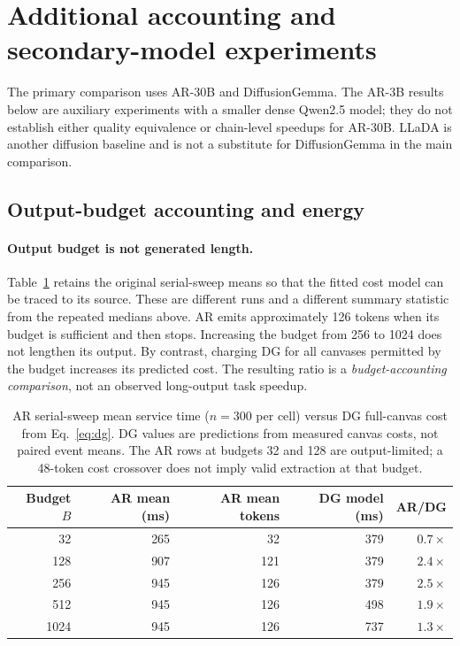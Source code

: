 \section{Additional accounting and secondary-model experiments}
\label{app:secondary}

The primary comparison uses AR-30B and DiffusionGemma.
The AR-3B results below are auxiliary experiments with a smaller dense
Qwen2.5 model; they do not establish either quality equivalence or
chain-level speedups for AR-30B. LLaDA is another diffusion baseline and
is not a substitute for DiffusionGemma in the main comparison.

\subsection{Output-budget accounting and energy}
\paragraph{Output budget is not generated length.}
Table~\ref{tab:niche} retains the original serial-sweep means so that
the fitted cost model can be traced to its source. These are different
runs and a different summary statistic from the repeated medians above.
AR emits approximately 126 tokens when its budget is sufficient and
then stops. Increasing the budget from 256 to 1024 does not lengthen
its output. By contrast, charging DG for all canvases permitted by the
budget increases its predicted cost. The resulting ratio is a
\emph{budget-accounting comparison}, not an observed long-output task
speedup.

\begin{table}[ht]
\centering
\caption{AR serial-sweep mean service time ($n{=}300$ per cell) versus
DG full-canvas cost from Eq.~\ref{eq:dg}. DG values are predictions
from measured canvas costs, not paired event means. The AR rows at
budgets 32 and 128 are output-limited; a 48-token cost crossover does
not imply valid extraction at that budget.}
\label{tab:niche}
\begin{tabular}{@{}rrrrr@{}}
\toprule
Budget $B$ & AR mean (ms) & AR mean tokens & DG model (ms) & AR/DG \\
\midrule
32 & 265 & 32 & 379 & $0.7\times$ \\
128 & 907 & 121 & 379 & $2.4\times$ \\
256 & 945 & 126 & 379 & $2.5\times$ \\
512 & 945 & 126 & 498 & $1.9\times$ \\
1024 & 945 & 126 & 737 & $1.3\times$ \\
\bottomrule
\end{tabular}
\end{table}

